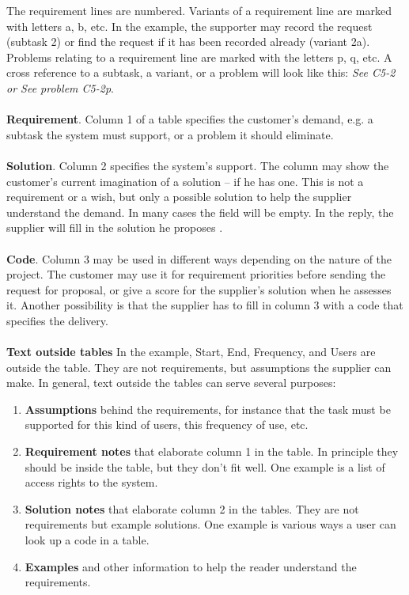 \documentclass[Main]{subfiles}
\begin{document}
The requirement lines are numbered. 
Variants of a requirement line are marked with letters a, b, etc. 
In the example, the supporter may record the request (subtask 2) or find the request if it has been recorded already (variant 2a). 
Problems relating to a requirement line are marked with the letters p, q, etc. 
A cross reference to a subtask, a variant, or a problem will look like this:
	\textit{See C5-2 or See problem C5-2p}.
\\
\\
\textbf{Requirement}. 
Column 1 of a table specifies the customer's demand, e.g. a subtask the system must support, or a problem it should eliminate. 
\\
\\
\textbf{Solution}. 
Column 2 specifies the system's support. 
The column may show the customer's current imagination of a solution -- if he has one. 
This is not a requirement or a wish, but only a possible solution to help the supplier understand the demand. 
In many cases the field will be empty. 
In the reply, the supplier will fill in the solution he proposes .
\\
\\
\textbf{Code}. 
Column 3 may be used in different ways depending on the nature of the project. 
The customer may use it for requirement priorities before sending the request for proposal, or give a score for the supplier's solution when he assesses it. 
Another possibility is that the supplier has to fill in column 3 with a code that specifies the delivery.
\\
\\
\textbf{Text outside tables}
In the example, Start, End, Frequency, and Users are outside the table. 
They are not requirements, but assumptions the supplier can make. 
In general, text outside the tables can serve several purposes:

\begin{enumerate}[A]
\item \textbf{Assumptions} behind the requirements, for instance that the task must be supported for this kind of users, this frequency of use, etc.

\item \textbf{Requirement notes} that elaborate column 1 in the table. 
In principle they should be inside the table, but they don't fit well. 
One example is a list of access rights to the system.

\item \textbf{Solution notes} that elaborate column 2 in the tables. 
They are not requirements but example solutions. 
One example is various ways a user can look up a code in a table.

\item \textbf{Examples} and other information to help the reader understand the requirements.
\end{enumerate}
\end{document}

